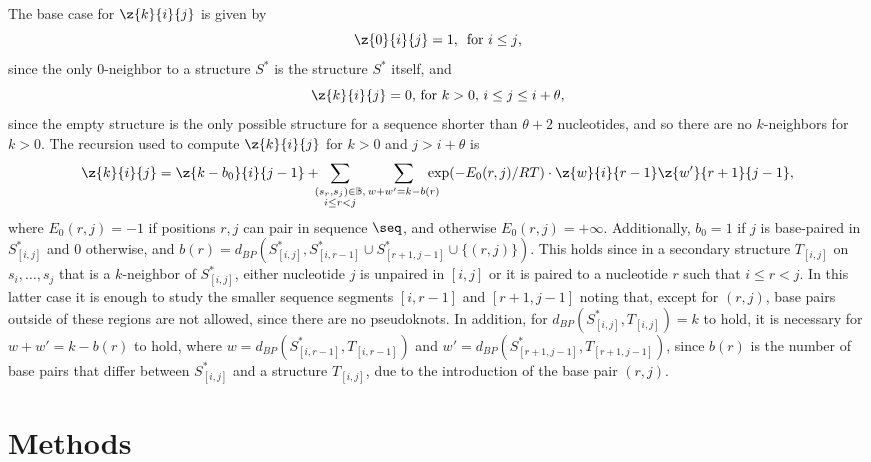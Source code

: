 The base case for $\z{k}{i}{j}$ is given by
\begin{equation}
  \z{0}{i}{j} = 1,\, \mbox{ for $i \le j$,}
  \label{eq:Zinit1}
\end{equation}
since the only $0$-neighbor to a structure $S^*$
is the structure $S^*$ itself, and
\begin{equation}
  \z{k}{i}{j} = 0,\, \mbox{for $k > 0$, $i \le j \leq
    i+\theta$},
  \label{eq:Zinit2}
\end{equation}
since the empty structure is the only possible structure for a
sequence shorter than $\theta + 2$ nucleotides, and so there are no
$k$-neighbors for $k>0$. The recursion used to compute
$\z{k}{i}{j}$ for $k > 0$ and $j > i+\theta$ is
\begin{equation}
  \z{k}{i}{j} = \z{k -b_0}{i}{j-1} +
  \hspace{-5pt} \sum_{\substack{ (s_r,s_j) \in \mathbb{B}, \\
  i \leq r < j }} \sum_{w+w'=k - b(r)} \hspace{-10pt}
  \exp(-E_0(r,j)/RT) \cdot \z{w}{i}{r-1} \z{w'}{r+1}{j-1},
  \label{eq:N}
\end{equation}
where $E_0(r,j) = -1$ if positions $r,j$ can pair in sequence $\seq$,
and otherwise $E_0(r,j) = +\infty$. Additionally,
$b_0 = 1$ if $j$ is base-paired
in $S^*_{[i,j]}$ and $0$ otherwise, and
$b(r)=d_{BP}(S^*_{[i,j]}, S^*_{[i,r-1]} \cup S^*_{[r+1,j-1]} \cup\{(r,j)\})$.
This holds since in a secondary
structure $T_{[i,j]}$ on $s_i,\ldots,s_j$ that is a $k$-neighbor of
$S^*_{[i,j]}$,
either nucleotide $j$ is unpaired in $[i,j]$ or it is
paired to a nucleotide $r$ such that $i \leq r < j$. In this
latter case it is enough to study the smaller sequence segments
$[i,r-1]$ and $[r+1,j-1]$ noting that, except for $(r,j)$,
base pairs outside of these regions are not allowed, since there
are no pseudoknots. In addition,
for $d_{BP}(S^*_{[i,j]},T_{[i,j]}) = k$ to hold,
it is necessary for $w+w' = k -b(r)$ to hold, where $w =
d_{BP}(S^*_{[i,r-1]},T_{[i,r-1]})$ and $w' =
d_{BP}(S^*_{[r+1,j-1]},T_{[r+1,j-1]})$, since $b(r)$ is the
number of base pairs that differ between $S^*_{[i,j]}$ and a
structure $T_{[i,j]}$, due to the introduction of the base pair
$(r,j)$.

\section*{Methods}

